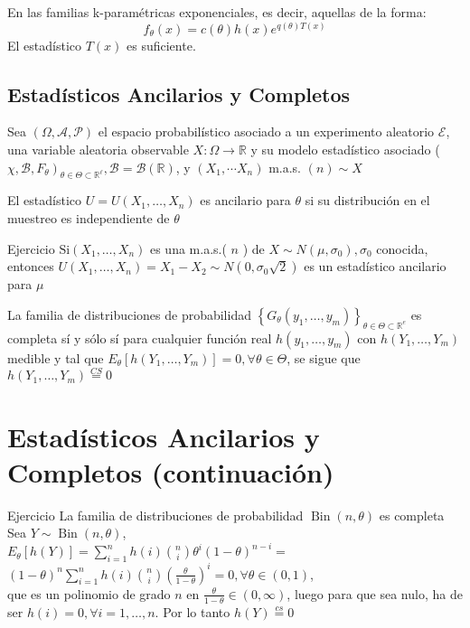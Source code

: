 \begin{proposición}
  En las familias k-paramétricas exponenciales, es decir, aquellas de la forma: 
  $$ f_{\theta}(x) = c(\theta)h(x)e^{q(\theta)T(x)}$$
  El estadístico $T(x)$ es suficiente. 
\end{proposición}

  
\subsection{Estadísticos Ancilarios y Completos}
Sea $(\Omega, \mathcal{A}, \mathcal{P})$ el espacio probabilístico asociado a un experimento aleatorio $\mathcal{E}$, una variable aleatoria observable $X: \Omega \longrightarrow \mathbb{R}$ y su modelo estadístico asociado ( $\left.\chi, \mathcal{B}, F_{\theta}\right)_{\theta \in \Theta \subset \mathbb{R}^{\ell}}, \mathcal{B}=\mathcal{B}(\mathbb{R})$, y $\left(X_{1}, \cdots X_{n}\right)$ m.a.s. $(n) \sim X$
  
El estadístico $U=U\left(X_{1}, \ldots, X_{n}\right)$ es ancilario para $\theta$ si su distribución en el muestreo es independiente de $\theta$
  
Ejercicio $\mathrm{Si}\left(X_{1}, \ldots, X_{n}\right)$ es una m.a.s.( $n$ ) de $X \sim N\left(\mu, \sigma_{0}\right), \sigma_{0}$ conocida, entonces $U\left(X_{1}, \ldots, X_{n}\right)=X_{1}-X_{2} \sim N\left(0, \sigma_{0} \sqrt{2}\right)$ es un estadístico ancilario para $\mu$
  
La familia de distribuciones de probabilidad $\left\{G_{\theta}\left(y_{1}, \ldots, y_{m}\right)\right\}_{\theta \in \Theta \subset \mathbb{R}^{e}}$ es completa sí y sólo sí para cualquier función real $h\left(y_{1}, \ldots, y_{m}\right)$ con $h\left(Y_{1}, \ldots, Y_{m}\right)$ medible y tal que $E_{\theta}\left[h\left(Y_{1}, \ldots, Y_{m}\right)\right]=0, \forall \theta \in \Theta$, se sigue que $h\left(Y_{1}, \ldots, Y_{m}\right) \stackrel{C S}{=} 0$
  
\section*{Estadísticos Ancilarios y Completos (continuación)}
Ejercicio La familia de distribuciones de probabilidad $\operatorname{Bin}(n, \theta)$ es completa\\
Sea $Y \sim \operatorname{Bin}(n, \theta)$,\\
$E_{\theta}[h(Y)]=\sum_{i=1}^{n} h(i)\binom{n}{i} \theta^{i}(1-\theta)^{n-i}=$\\
$(1-\theta)^{n} \sum_{i=1}^{n} h(i)\binom{n}{i}\left(\frac{\theta}{1-\theta}\right)^{i}=0, \forall \theta \in(0,1)$,\\
que es un polinomio de grado $n$ en $\frac{\theta}{1-\theta} \in(0, \infty)$, luego para que sea nulo, ha de ser $h(i)=0, \forall i=1, \ldots, n$. Por lo tanto $h(Y) \stackrel{c s}{=} 0$
  
